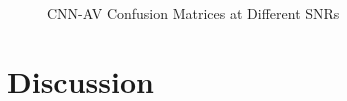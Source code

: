 \documentclass[journal,onecolumn]{IEEEtran}
\begin{document}
\begin{figure}[!ht]
   \centering
   \quad
   \\
   \quad
   \caption{CNN-AV Confusion Matrices at Different SNRs}
   \label{fig:cnnConfSep}
\end{figure}

\section{Discussion}
\end{document}
